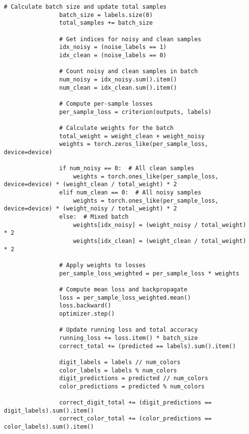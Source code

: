 \begin{lstlisting}[style=pythonstyle, caption={Program Example}]
                # Calculate batch size and update total samples
                batch_size = labels.size(0)
                total_samples += batch_size
    
                # Get indices for noisy and clean samples
                idx_noisy = (noise_labels == 1)
                idx_clean = (noise_labels == 0)
    
                # Count noisy and clean samples in batch
                num_noisy = idx_noisy.sum().item()
                num_clean = idx_clean.sum().item()
    
                # Compute per-sample losses
                per_sample_loss = criterion(outputs, labels)
    
                # Calculate weights for the batch
                total_weight = weight_clean + weight_noisy
                weights = torch.zeros_like(per_sample_loss, device=device)
                
                if num_noisy == 0:  # All clean samples
                    weights = torch.ones_like(per_sample_loss, device=device) * (weight_clean / total_weight) * 2
                elif num_clean == 0:  # All noisy samples
                    weights = torch.ones_like(per_sample_loss, device=device) * (weight_noisy / total_weight) * 2
                else:  # Mixed batch
                    weights[idx_noisy] = (weight_noisy / total_weight) * 2
                    weights[idx_clean] = (weight_clean / total_weight) * 2
    
                # Apply weights to losses
                per_sample_loss_weighted = per_sample_loss * weights
    
                # Compute mean loss and backpropagate
                loss = per_sample_loss_weighted.mean()
                loss.backward()
                optimizer.step()
    
                # Update running loss and total accuracy
                running_loss += loss.item() * batch_size
                correct_total += (predicted == labels).sum().item()
    
                digit_labels = labels // num_colors
                color_labels = labels % num_colors
                digit_predictions = predicted // num_colors
                color_predictions = predicted % num_colors
    
                correct_digit_total += (digit_predictions == digit_labels).sum().item()
                correct_color_total += (color_predictions == color_labels).sum().item()
    

\end{lstlisting}
